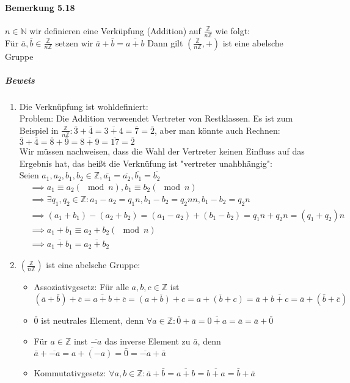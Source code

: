\documentclass[a4paper]{scrartcl}
\DeclareMathOperator{\Forall}{\forall}
\theoremstyle{definition}
\theoremstyle{plain}
\theoremstyle{plain}
\theoremstyle{remark}
\theoremstyle{remark}
\theoremstyle{remark}
\theoremstyle{remark}
\theoremstyle{remark}
\begin{document}
\paragraph{Bemerkung 5.18}
\label{sec-3-1-7-4}
$n\in\mathbb{N}$ wir definieren eine Verküpfung (Addition) auf $\frac{\mathbb{Z}}{n\mathbb{Z}}$ wie folgt: \\
     Für $\bar a,\bar b \in\frac{\mathbb{Z}}{n\mathbb{Z}}$ setzen wir $\bar a + \bar b = \overline{a + b}$
Dann gilt $(\frac{\mathbb{Z}}{n\mathbb{Z}},+)$ ist eine abelsche Gruppe
\subparagraph{Beweis}
\label{sec-3-1-7-4-1}
\begin{enumerate}
\item Die Verknüpfung ist wohldefiniert: \\ Problem: Die Addition verweendet Vertreter von Restklassen. Es ist zum Beispiel in $\frac{\mathbb{Z}}{n\mathbb{Z}}: \bar 3 + \bar 4 = \overline{3 + 4} = \bar 7 = \bar 2$, aber man könnte auch Rechnen:
$\bar 3 + \bar 4 = \bar 8 + \bar 9 = \overline{8 + 9} = \overline{17} = \bar 2$ \\
         Wir müssen nachweisen, dass die Wahl der Vertreter keinen Einfluss auf das Ergebnis hat, das heißt die Verknüfung ist "vertreter unahbhängig": \\
         Seien $a_1,a_2 ,b_1,b_2 \in\mathbb{Z},\overline{a_1} = \overline{a_2},\overline{b_1} = \overline{b_2}$
\begin{align}
&\implies a_1 \equiv a_2(\mod n), b_1 \equiv b_2(\mod n) \\
&\implies\exists q_1,q_2\in\mathbb{Z}: a_1 - a_2 = q_1 n, b_1 - b_2 = q_2 n n, b_1 - b_2 = q_2 n \\
&\implies (a_1 + b_1) - (a_2 + b_2) = (a_1 - a_2)+ (b_1 - b_2) = q_1 n + q_2 n = (q_1 + q_2) n \\
&\implies a_1 + b_ 1 \equiv a_2 + b_2 (\mod n) \\
&\implies \overline{a_1 + b_1} = \overline{a_2 + b_2}
\end{align}
\item $(\frac{\mathbb{Z}}{n\mathbb{Z}})$ ist eine abelsche Gruppe:
\begin{itemize}
\item Assoziativgesetz: Für alle $a,b,c\in\mathbb{Z}$ ist
\[(\bar a + \bar b) + \bar c = \overline{a + b} + \bar c = \overline{(a + b) + c} = \overline{a + (b + c)} = \bar a + \overline{b + c} = \bar a + (\bar b + \bar c)\]
\item $\bar 0$ ist neutrales Element, denn $\Forall a\in\mathbb{Z}:\bar 0 + \bar a = \overline{0 + a} = \bar a = \bar a + \bar 0$
\item Für $a\in\mathbb{Z}$ inst $\overline{-a}$ das inverse Element zu $\bar a$, denn $\bar a + \overline{-a} = \overline{a + (- a)} = \bar 0 = \overline{-a} + \bar a$
\item Kommutativgesetz: $\Forall a,b\in\mathbb{Z}:\bar a + \bar b = \overline{a + b} = \overline{b + a} = \bar b + \bar a$
\end{itemize}
\end{enumerate}
\end{document}
